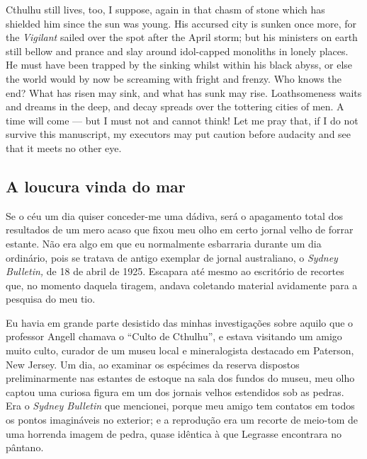 \begin{pages}
\begin{Leftside}
Cthulhu still lives, too, I suppose, again in that chasm of stone which
has shielded him since the sun was young. His accursed city is sunken
once more, for the \emph{Vigilant} sailed over the spot after the April storm;
but his ministers on earth still bellow and prance and slay around
idol-capped monoliths in lonely places. He must have been trapped by the
sinking whilst within his black abyss, or else the world would by now be
screaming with fright and frenzy. Who knows the end? What has risen may
sink, and what has sunk may rise. Loathsomeness waits and dreams in the
deep, and decay spreads over the tottering cities of men. A time will
come --- but I must not and cannot think! Let me pray that, if I do not
survive this manuscript, my executors may put caution before audacity
and see that it meets no other eye.

      \pend
         \endnumbering
    \end{Leftside}
    \begin{Rightside}
        \beginnumbering
            \pstart

\chapter{A loucura vinda do mar}

\noindent{}Se o céu um dia quiser conceder-me uma dádiva, será o apagamento total
dos resultados de um mero acaso que fixou meu olho em certo jornal velho
de forrar estante. Não era algo em que eu normalmente esbarraria durante
um dia ordinário, pois se tratava de antigo exemplar de jornal
australiano, o \emph{Sydney Bulletin,} de 18 de abril de 1925. Escapara
até mesmo ao escritório de recortes que, no momento daquela tiragem,
andava coletando material avidamente para a pesquisa do meu tio.

Eu havia em grande parte desistido das minhas investigações sobre aquilo
que o professor Angell chamava o ``Culto de Cthulhu'', e estava
visitando um amigo muito culto, curador de um museu local e
mineralogista destacado em Paterson, New Jersey. Um dia, ao examinar os
espécimes da reserva dispostos preliminarmente nas estantes de estoque
na sala dos fundos do museu, meu olho captou uma curiosa figura em um
dos jornais velhos estendidos sob as pedras. Era o \emph{Sydney
Bulletin} que mencionei, porque meu amigo tem contatos em todos os
pontos imagináveis no exterior; e a reprodução era um recorte de
meio-tom de uma horrenda imagem de pedra, quase idêntica à que Legrasse
encontrara no pântano.


\end{Rightside}
\end{pages}
